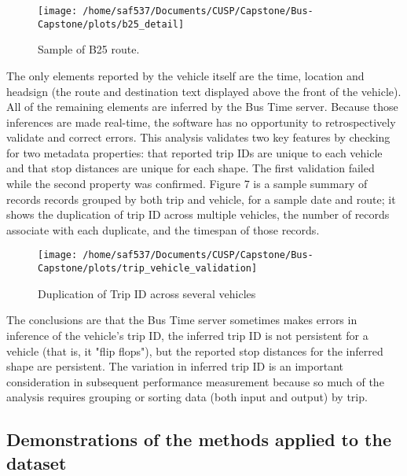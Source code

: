 \documentclass[12pt]{report}
\begin{document}
\begin{figure}[!ht]
\label{b26}
  \caption{Sample of B25 route.}
  \centering
    \texttt{[image: /home/saf537/Documents/CUSP/Capstone/Bus-Capstone/plots/b25\_detail]}
\end{figure}

The only elements reported by the vehicle itself are the time, location and headsign (the route and destination text displayed above the front of the vehicle).  All of the remaining elements are inferred by the Bus Time server.  Because those inferences are made real-time, the software has no opportunity to retrospectively validate and correct errors.  This analysis validates two key features by checking for two metadata properties: that reported trip IDs are unique to each vehicle and that stop distances are unique for each shape.  The first validation failed while the second property was confirmed.  Figure 7 is a sample summary of records records grouped by both trip and vehicle, for a sample date and route; it shows the duplication of trip ID across multiple vehicles, the number of records associate with each duplicate, and the timespan of those records.


\begin{figure}[!ht]
\label{trip_val}
  \caption{Duplication of Trip ID across several vehicles}
  \centering
    \texttt{[image: /home/saf537/Documents/CUSP/Capstone/Bus-Capstone/plots/trip\_vehicle\_validation]}
\end{figure}

The conclusions are that the Bus Time server sometimes makes errors in inference of the vehicle's trip ID, the inferred trip ID is not persistent for a vehicle (that is, it "flip flops"), but the reported stop distances for the inferred shape are persistent.  The variation in inferred trip ID is an important consideration in subsequent performance measurement because so much of the analysis requires grouping or sorting data (both input and output) by trip.




\subsection{Demonstrations of the methods applied to the dataset}
\end{document}

